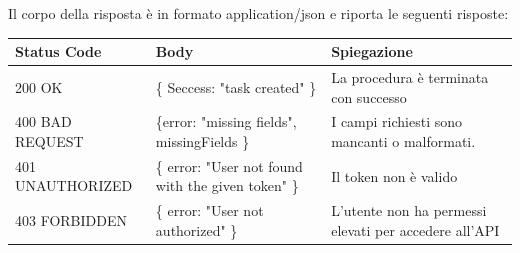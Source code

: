 \documentclass{report}
\begin{document}
Il corpo della risposta è in formato application/json e riporta le seguenti risposte:

\begin{center} %
	\centering
	\begin{tabular}{ |p{4cm}|p{4cm}|p{4cm}| }
		\hline
		\centering Status Code & \qquad\qquad\quad Body & \qquad\quad Spiegazione\\ %
		\hline
		200 OK & \{ Seccess: "task created" \}  & La procedura è terminata con successo	\\ 
		\hline
		400 BAD REQUEST & \{error: "missing fields", missingFields \} & I campi richiesti sono mancanti o malformati. \\
		\hline
		401 UNAUTHORIZED & \{ error: "User not found with the given token" \} & Il token non è valido \\
		\hline
		403 FORBIDDEN & \{ error: "User not authorized" \} &  L'utente non ha permessi elevati per accedere all'API \\
		\hline
	\end{tabular}
\end{center}
\end{document}
